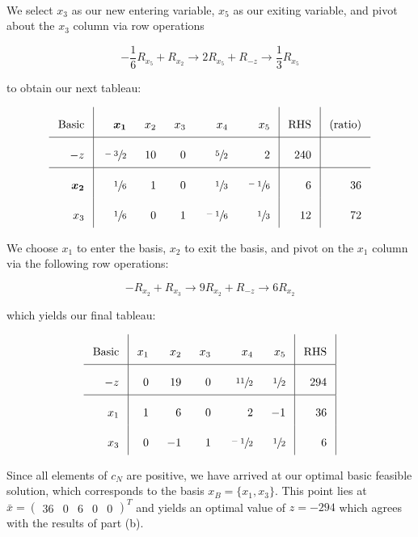 \begin{solution}
  \ \\
  We select $x_3$ as our new entering variable, $x_5$ as our exiting variable, and pivot about the $x_3$ column via 
  row operations

  $$
  -\frac{1}{6} R_{x_5} + R_{x_2}  \longrightarrow 2 R_{x_5} + R_{-z} \longrightarrow \frac{1}{3} R_{x_5}
  $$

  to obtain our next tableau:

  \[\arraycolsep=8pt\def\arraystretch{2.2}
  \begin{array}{r|rrrrr|r|r}
     \text{Basic} &  \bm{x_1}      &  x_2 &  x_3  &  x_4           &  x_5           &  \text{RHS} &  \text{(ratio)} \\ \hline
    -z            &  \sfrac{-3}{2} &  10  &  0    &  \sfrac{5}{2}  &  2             &  240        &                 \\ \hline
     \bm{x_2}     &  \sfrac{1}{6}  &  1   &  0    &  \sfrac{1}{3}  &  \sfrac{-1}{6} &  6          &  36             \\
     x_3          &  \sfrac{1}{6}  &  0   &  1    &  \sfrac{-1}{6} &  \sfrac{1}{3}  &  12         &  72                           
  \end{array}
  \]

  We choose $x_1$ to enter the basis, $x_2$ to exit the basis, and pivot on the $x_1$ column via the following row 
  operations:

  $$
  -R_{x_2} + R_{x_3}  \longrightarrow 9 R_{x_2} + R_{-z} \longrightarrow 6 R_{x_2}
  $$


  which yields our final tableau:

  \[\arraycolsep=8pt\def\arraystretch{2.2}
  \begin{array}{r|rrrrr|r|r}
    \text{Basic} &  x_1  &  x_2 &  x_3  &  x_4           &  x_5           &  \text{RHS} \\ \hline
    -z           &  0    &  19  &  0    &  \sfrac{11}{2} &  \sfrac{1}{2}  &  294        \\ \hline
    x_1          &  1    &  6   &  0    &  2             & -1             &  36         \\
    x_3          &  0    & -1   &  1    &  \sfrac{-1}{2} &  \sfrac{1}{2}  &  6                            
  \end{array}
  \]

  Since all elements of $c_N$ are positive, we have arrived at our optimal basic feasible solution, which corresponds to
  the basis $x_B = \{x_1, x_3\}$. This point lies at \linebreak
  $\bar{x} = \begin{pmatrix} 36 &  0  &  6  &  0  &  0 \end{pmatrix}^T$ and yields an optimal value of $z = -294$ which
  agrees with the results of part (b).
  \ \\
\end{solution}